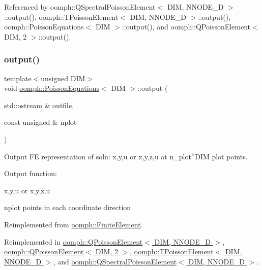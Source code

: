 Referenced by oomph\+::\+Q\+Spectral\+Poisson\+Element$<$ D\+I\+M, N\+N\+O\+D\+E\+\_\+D $>$\+::output(), oomph\+::\+T\+Poisson\+Element$<$ D\+I\+M, N\+N\+O\+D\+E\+\_\+D $>$\+::output(), oomph\+::\+Poisson\+Equations$<$ D\+I\+M $>$\+::output(), and oomph\+::\+Q\+Poisson\+Element$<$ D\+I\+M, 2 $>$\+::output().

\mbox{\label{classoomph_1_1PoissonEquations_a6683dd0afc16bfddf4e79b6e0e449d43}} 
\subsubsection{\texorpdfstring{output()}{output()}\hspace{0.1cm}{\footnotesize\ttfamily [2/4]}}
{\footnotesize\ttfamily template$<$unsigned D\+IM$>$ \\
void \hyperlink{classoomph_1_1PoissonEquations}{oomph\+::\+Poisson\+Equations}$<$ D\+IM $>$\+::output (\begin{DoxyParamCaption}\item[{std\+::ostream \&}]{outfile,  }\item[{const unsigned \&}]{nplot }\end{DoxyParamCaption})\hspace{0.3cm}{\ttfamily [virtual]}}



Output FE representation of soln\+: x,y,u or x,y,z,u at n\+\_\+plot$^\wedge$\+D\+IM plot points. 

Output function\+:

x,y,u or x,y,z,u

nplot points in each coordinate direction 

Reimplemented from \hyperlink{classoomph_1_1FiniteElement_afa9d9b2670f999b43e6679c9dd28c457}{oomph\+::\+Finite\+Element}.



Reimplemented in \hyperlink{classoomph_1_1QPoissonElement_a1b9e0f365936b175ed3405369f05b4af}{oomph\+::\+Q\+Poisson\+Element$<$ D\+I\+M, N\+N\+O\+D\+E\+\_\+D $>$}, \hyperlink{classoomph_1_1QPoissonElement_a1b9e0f365936b175ed3405369f05b4af}{oomph\+::\+Q\+Poisson\+Element$<$ D\+I\+M, 2 $>$}, \hyperlink{classoomph_1_1TPoissonElement_a8a9139cd1265c160c2c88df86fae8b6c}{oomph\+::\+T\+Poisson\+Element$<$ D\+I\+M, N\+N\+O\+D\+E\+\_\+D $>$}, and \hyperlink{classoomph_1_1QSpectralPoissonElement_a09f0813f51286ed47f4e89536e8c4e2e}{oomph\+::\+Q\+Spectral\+Poisson\+Element$<$ D\+I\+M, N\+N\+O\+D\+E\+\_\+D $>$}.



